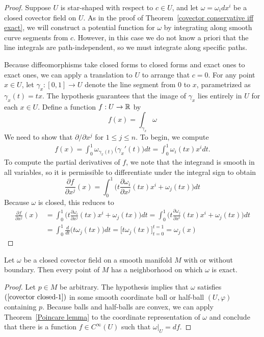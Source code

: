 \begin{proof}
Suppose $U$ is star-shaped with respect to $c\in U$, and let $\omega=\omega_idx^i$ be a closed covector field on $U$. As in the proof of Theorem~\ref{covector conservative iff exact}, we will construct a potential function for $\omega$ by integrating along smooth curve segments from $c$. However, in this case we do not know a priori that the line integrals are path-independent, so we must integrate along specific paths.\par
Because diffeomorphisms take closed forms to closed forms and exact ones to
exact ones, we can apply a translation to $U$ to arrange that $c=0$. For any point $x\in U$, let $\gamma_x:[0,1]\to U$ denote the line segment from $0$ to $x$, parametrized as $\gamma_x(t)=tx$. The hypothesis guarantees that the image of $\gamma_x$ lies entirely in $U$ for each $x\in U$. Define a function $f:U\to\mathbb{R}$ by
\[f(x)=\int_{\gamma_x}\omega\]
We need to show that $\partial/\partial x^j$ for $1\leq j\leq n$. To begin, we compute
\begin{align}\label{Poincare lemma construction}
f(x)=\int_{0}^{1}\omega_{\gamma_x(t)}\big(\gamma_x'(t)\big)dt=\int_{0}^{1}\omega_i(tx)x^idt.
\end{align}
To compute the partial derivatives of $f$, we note that the integrand is smooth in all variables, so it is permissible to differentiate under the integral sign to obtain
\[\frac{\partial f}{\partial x^j}(x)=\int_{0}^{1}\Big(t\frac{\partial\omega_i}{\partial x^j}(tx)x^i+\omega_j(tx)\Big)dt\]
Because $\omega$ is closed, this reduces to
\begin{align*}
\frac{\partial f}{\partial x^j}(x)&=\int_{0}^{1}\Big(t\frac{\partial\omega_i}{\partial x^j}(tx)x^i+\omega_j(tx)\Big)dt=\int_{0}^{1}\Big(t\frac{\partial\omega_j}{\partial x^i}(tx)x^i+\omega_j(tx)\Big)dt\\
&=\int_{0}^{1}\frac{d}{dt}\big(t\omega_j(tx)\big)dt=\Big[t\omega_j(tx)\Big]_{t=0}^{t=1}=\omega_j(x)
\end{align*}
\end{proof}
\begin{corollary}
Let $\omega$ be a closed covector field on a smooth manifold $M$ with or without boundary. Then every point of $M$ has a neighborhood on which $\omega$ is exact.
\end{corollary}
\begin{proof}
Let $p\in M$ be arbitrary. The hypothesis implies that $\omega$ satisfies $(\ref{covector closed-1})$ in some smooth coordinate ball or half-ball $(U,\varphi)$ containing $p$. Because balls and half-balls are convex, we can apply Theorem~\ref{Poincare lemma} to the coordinate representation of $\omega$ and conclude that there is a function $f\in C^\infty(U)$ such that $\omega|_U=df$.
\end{proof}
